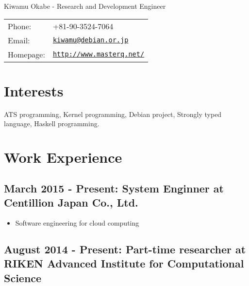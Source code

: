 \documentclass[letterpaper]{article}
\def\name{Kiwamu Okabe - Research and Development Engineer}
\begin{document}
{\huge \name}


\vspace{0.25in}

\begin{minipage}{0.3\linewidth}
  \begin{tabular}{ll}
    Phone: & +81-90-3524-7064 \\
    Email: & \href{mailto:kiwamu@debian.or.jp}{\tt kiwamu@debian.or.jp} \\
    Homepage: & \href{http://www.masterq.net/}{\tt http://www.masterq.net/} \\
  \end{tabular}
\end{minipage}

\section*{Interests}

ATS programming, Kernel programming, Debian project, Strongly typed language, Haskell programming.


\section*{Work Experience}
\subsection*{March 2015 - Present: System Enginner at Centillion Japan Co., Ltd.}

\begin{itemize}
  \item Software engineering for cloud computing
\end{itemize}

\subsection*{August 2014 - Present: Part-time researcher at RIKEN Advanced Institute for Computational Science}
\end{document}
